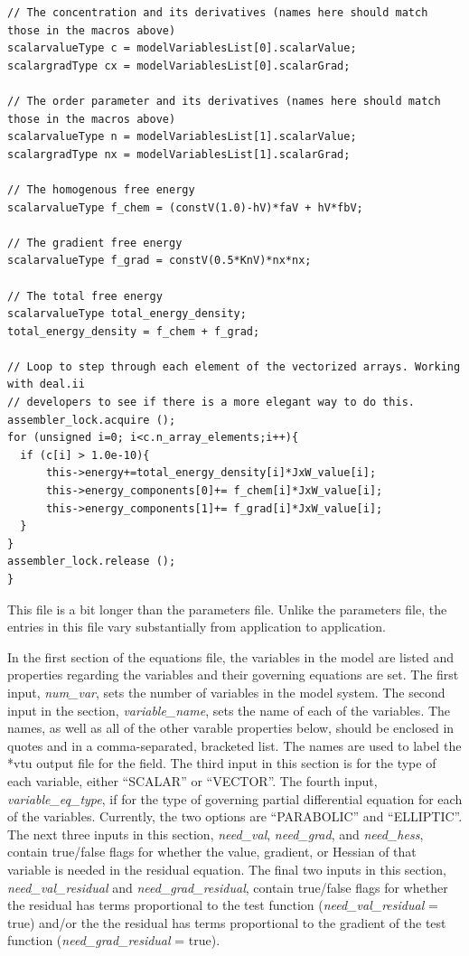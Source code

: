 \documentclass[10pt]{article} %
\begin{document}
\begin{lstlisting}
// The concentration and its derivatives (names here should match those in the macros above)
scalarvalueType c = modelVariablesList[0].scalarValue;
scalargradType cx = modelVariablesList[0].scalarGrad;

// The order parameter and its derivatives (names here should match those in the macros above)
scalarvalueType n = modelVariablesList[1].scalarValue;
scalargradType nx = modelVariablesList[1].scalarGrad;

// The homogenous free energy
scalarvalueType f_chem = (constV(1.0)-hV)*faV + hV*fbV;

// The gradient free energy
scalarvalueType f_grad = constV(0.5*KnV)*nx*nx;

// The total free energy
scalarvalueType total_energy_density;
total_energy_density = f_chem + f_grad;

// Loop to step through each element of the vectorized arrays. Working with deal.ii
// developers to see if there is a more elegant way to do this.
assembler_lock.acquire ();
for (unsigned i=0; i<c.n_array_elements;i++){
  if (c[i] > 1.0e-10){
	  this->energy+=total_energy_density[i]*JxW_value[i];
	  this->energy_components[0]+= f_chem[i]*JxW_value[i];
	  this->energy_components[1]+= f_grad[i]*JxW_value[i];
  }
}
assembler_lock.release ();
}
\end{lstlisting}
\normalsize

This file is a bit longer than the parameters file. Unlike the parameters file, the entries in this file vary substantially from application to application.

In the first section of the equations file, the variables in the model are listed and properties regarding the variables and their governing equations are set. The first input, \emph{num\_var}, sets the number of variables in the model system. The second input in the section, \emph{variable\_name}, sets the name of each of the variables. The names, as well as all of the other varable properties below, should be enclosed in quotes and in a comma-separated, bracketed list. The names are used to label the *vtu output file for the field. The third input in this section is for the type of each variable, either ``SCALAR'' or ``VECTOR''.  The fourth input, \emph{variable\_eq\_type}, if for the type of governing partial differential equation for each of the variables. Currently, the two options are ``PARABOLIC'' and ``ELLIPTIC''. The next three inputs in this section, \emph{need\_val},  \emph{need\_grad},  and \emph{need\_hess}, contain true/false flags for whether the value, gradient, or Hessian of that variable is needed in the residual equation. The final two inputs in this section, \emph{need\_val\_residual} and \emph{need\_grad\_residual}, contain true/false flags for whether the residual has terms proportional to the test function (\emph{need\_val\_residual} = true) and/or the the residual has terms proportional to the gradient of the test function (\emph{need\_grad\_residual} = true).
\end{document}
